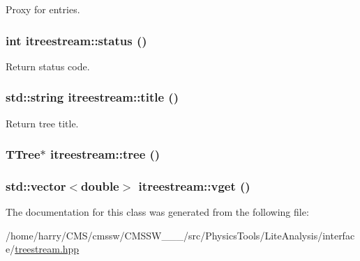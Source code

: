 Proxy for entries. 

\hypertarget{classitreestream_a7}{
\subsubsection[status]{\setlength{\rightskip}{0pt plus 5cm}int itreestream::status ()}}
\label{classitreestream_a7}


Return status code. 

\hypertarget{classitreestream_a24}{
\subsubsection[title]{\setlength{\rightskip}{0pt plus 5cm}std::string itreestream::title ()}}
\label{classitreestream_a24}


Return tree title. 

\hypertarget{classitreestream_a34}{
\subsubsection[tree]{\setlength{\rightskip}{0pt plus 5cm}TTree$\ast$ itreestream::tree ()}}
\label{classitreestream_a34}


\hypertarget{classitreestream_a29}{
\subsubsection[vget]{\setlength{\rightskip}{0pt plus 5cm}std::vector$<$double$>$ itreestream::vget ()}}
\label{classitreestream_a29}




The documentation for this class was generated from the following file:\begin{CompactItemize}
\item 
/home/harry/CMS/cmssw/CMSSW\_\_\_/src/Physics\-Tools/Lite\-Analysis/interface/\hyperlink{treestream_8hpp}{treestream.hpp}\end{CompactItemize}
